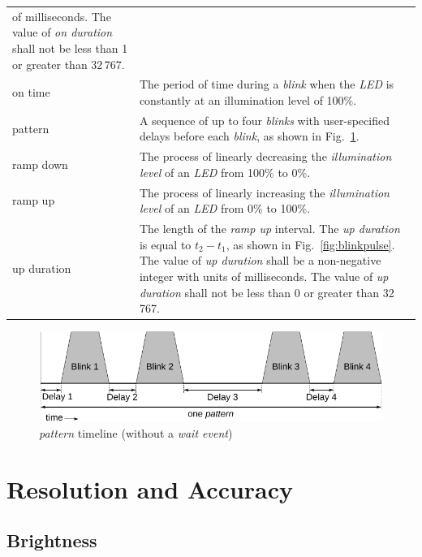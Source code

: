 \documentclass[letterpaper,11pt]{article}
\begin{document}
\begin{supertabular}{p{1.5in}p{5in}}
    of milliseconds. The value of \textit{on duration} shall not be less than 1
    or greater than 32\,767.\\
on time &
    The period of time during a \textit{blink} when the \textit{LED} is
    constantly at an illumination level of 100\%.\\
pattern &
    A sequence of up to four \textit{blinks} with user-specified delays before
    each \textit{blink}, as shown in Fig.\ \ref{fig:patterntimeline}.\\
ramp down &
    The process of linearly decreasing the \textit{illumination level} of an
    \textit{LED} from 100\% to 0\%.\\
ramp up &
    The process of linearly increasing the \textit{illumination level} of an
    \textit{LED} from 0\% to 100\%.\\
up duration &
    The length of the \textit{ramp up} interval. The \textit{up duration}
    is equal to $t_2 - t_1$, as shown in Fig.\ \ref{fig:blinkpulse}. The
    value of \textit{up duration} shall be a non-negative integer with units
    of milliseconds. The value of \textit{up duration} shall not be less than
    0 or greater than 32\,767.\\
\end{supertabular}

\begin{figure}[t]
  \begin{center}
    \includegraphics{Flashes_PatternTimeline}
  \end{center}
  \vspace{-18pt}
  \caption{\textit{pattern} timeline (without a \textit{wait event})}
  \label{fig:patterntimeline}
\end{figure}

\section{Resolution and Accuracy}

\subsection{Brightness}
\end{document}

